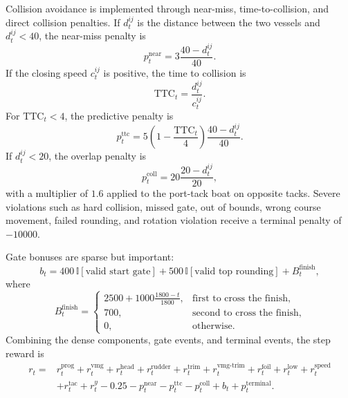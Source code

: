 \documentclass{article}
\begin{document}
Collision avoidance is implemented through near-miss, time-to-collision, and direct collision penalties. If $d^{ij}_t$ is the distance between the two vessels and $d^{ij}_t<40$, the near-miss penalty is
\begin{equation}
    p^{\mathrm{near}}_t =
    3\frac{40-d^{ij}_t}{40}.
\end{equation}
If the closing speed $c^{ij}_t$ is positive, the time to collision is
\begin{equation}
    \mathrm{TTC}_t = \frac{d^{ij}_t}{c^{ij}_t}.
\end{equation}
For $\mathrm{TTC}_t<4$, the predictive penalty is
\begin{equation}
    p^{\mathrm{ttc}}_t =
    5\left(1-\frac{\mathrm{TTC}_t}{4}\right)
    \frac{40-d^{ij}_t}{40}.
\end{equation}
If $d^{ij}_t<20$, the overlap penalty is
\begin{equation}
    p^{\mathrm{coll}}_t =
    20\frac{20-d^{ij}_t}{20},
\end{equation}
with a multiplier of $1.6$ applied to the port-tack boat on opposite tacks. Severe violations such as hard collision, missed gate, out of bounds, wrong course movement, failed rounding, and rotation violation receive a terminal penalty of $-10000$.

Gate bonuses are sparse but important:
\begin{equation}
    b_t =
    400\,\mathbb{I}[\text{valid start gate}]
    +500\,\mathbb{I}[\text{valid top rounding}]
    +B^{\mathrm{finish}}_t,
\end{equation}
where
\begin{equation}
B^{\mathrm{finish}}_t=
\begin{cases}
2500+1000\frac{1800-t}{1800}, & \text{first to cross the finish},\\
700, & \text{second to cross the finish},\\
0, & \text{otherwise}.
\end{cases}
\end{equation}
Combining the dense components, gate events, and terminal events, the step reward is
\begin{align}
r_t ={}&
r^{\mathrm{prog}}_t
 + r^{\mathrm{vmg}}_t
 + r^{\mathrm{head}}_t
 + r^{\mathrm{rudder}}_t
 + r^{\mathrm{trim}}_t
 + r^{\mathrm{vmg\mbox{-}trim}}_t
 + r^{\mathrm{foil}}_t
 + r^{\mathrm{low}}_t
 + r^{\mathrm{speed}}_t \nonumber\\
{}&
 + r^{\mathrm{tac}}_t
 + r^{y}_t
 -0.25
 - p^{\mathrm{near}}_t
 - p^{\mathrm{ttc}}_t
 - p^{\mathrm{coll}}_t
 + b_t
 + p^{\mathrm{terminal}}_t.
\end{align}
\end{document}
